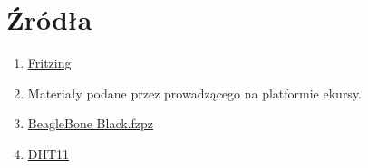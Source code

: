 \documentclass[polish,a4paper]{article}
\begin{document}
	\newpage

	\section*{Źródła}
	\begin{enumerate}
		\item \href{https://forum.fritzing.org/}{Fritzing}
		\item Materiały podane przez prowadzącego na platformie ekursy.
		\item \href{https://github.com/adafruit/Fritzing-Library/blob/master/parts/BeagleBone%20Black.fzpz}{BeagleBone Black.fzpz}
        \item \href{https://github.com/adafruit/Fritzing-Library/blob/master/parts/DHT11%20Humitidy%20and%20Temperature%20Sensor.fzpz}{DHT11}
	\end{enumerate}
	\begingroup
	\hypersetup{hidelinks}
	\tableofcontents
	\endgroup
\end{document}
